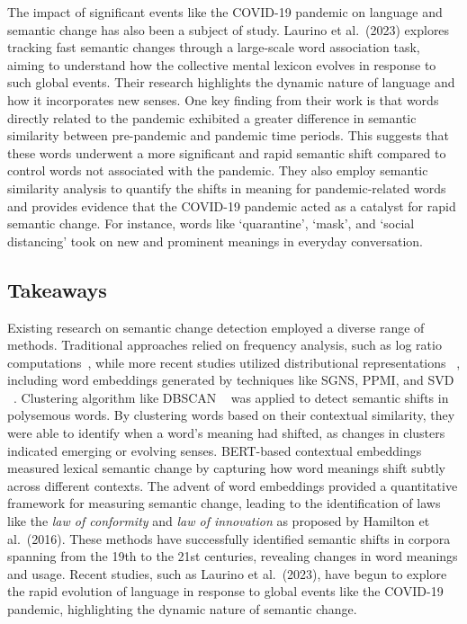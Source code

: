The impact of significant events like the COVID-19 pandemic on language and semantic change has also been a subject of study.
Laurino et al.\ (2023) explores tracking fast semantic changes through a large-scale word association task, aiming to understand how the collective mental lexicon evolves in response to such global events.
Their research highlights the dynamic nature of language and how it incorporates new senses.
One key finding from their work is that words directly related to the pandemic exhibited a greater difference in semantic similarity between pre-pandemic and pandemic time periods.
This suggests that these words underwent a more significant and rapid semantic shift compared to control words not associated with the pandemic.
They also employ semantic similarity analysis to quantify the shifts in meaning for pandemic-related words and provides evidence that the COVID-19 pandemic acted as a catalyst for rapid semantic change.
For instance, words like `quarantine', `mask', and `social distancing' took on new and prominent meanings in everyday conversation.

\subsection{Takeaways}\label{subsec:semantic-takeaways}
Existing research on semantic change detection employed a diverse range of methods.
Traditional approaches relied on frequency analysis, such as log ratio computations~\cite{gulordava-baroni-2011-distributional},
while more recent studies utilized distributional representations ~\cite{kim-etal-2014-temporal, kulkarni2014statisticallysignificantdetectionlinguistic, hamilton-etal-2016-cultural},
including word embeddings generated by techniques like SGNS, PPMI, and SVD ~\cite{hamilton-etal-2016-diachronic}.
Clustering algorithm like DBSCAN ~\cite{10.1007/978-3-319-50496-4_18} was applied to detect semantic shifts in polysemous words.
By clustering words based on their contextual similarity, they were able to identify when a word’s meaning had shifted, as changes in clusters indicated emerging or evolving senses.
BERT-based contextual embeddings ~\cite{giulianelli-etal-2020-analysing} measured lexical semantic change by capturing how word meanings shift subtly across different contexts.
The advent of word embeddings provided a quantitative framework for measuring semantic change,
leading to the identification of laws like the \emph{law of conformity} and \emph{law of innovation} as proposed by Hamilton et al.\ (2016).
These methods have successfully identified semantic shifts in corpora spanning from the 19th to the 21st centuries, revealing changes in word meanings and usage.
Recent studies, such as Laurino et al.\ (2023), have begun to explore the rapid evolution of language in response to global events like the COVID-19 pandemic,
highlighting the dynamic nature of semantic change.


